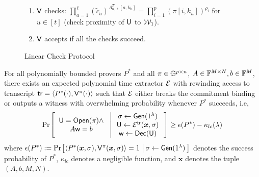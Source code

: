 \begin{figure}[h!]
{\begin{framed}
\begin{enumerate}[{\rm 1.}]
\begin{enumerate}
					\item $\innerproduct(\mathsf{pp},f_u^T\Lambda_{h,2m-1},\mathsf{cm}_{k_u},v_u;\overline{P}[\cdot,k_u])$ 
					for $u\in [t]$ where $\mathsf{cm}_{k_u}=\prod_{a=1}^{s+\ell-1}c_a^{\Lambda^T_{n,s+\ell-1}[a,k_u]}$, 
					$v_u=\sum_{i=1}^pR^i(\alpha_{j_u},\eta_{k_u})U[i,j_u,k_u]$ (check consistency of $P$ with $\pi$).
					\item $\innerproduct(\mathsf{pp},1^m||0^{m-1},\mathsf{cm},r^Tb;z)$ where $z=\beta P_0+\overline{P}\varphi$ and $\mathsf{cm}=c_0^{\beta}\cdot \prod_{a=1}^{s+\ell-1}c_k^{\varphi_k}$ (check the condition $r^TAw=r^Tb$).
					\item $\innerproduct(\mathsf{pp},f_u^T\Lambda_{h,m},C_u,\innp{\delta}{X_u})$ for $u\in [t]$ 
					where $C_u=\prod_{i=1}^p(\pi[i,k_u])^{\delta_i}$ (consistency of $X_u$ with $\pi$). 
				\end{enumerate}
				\item $\mathsf{V}$ checks: $\prod_{a=1}^\ell(\tilde{c}_a)^{\Lambda^T_{n,\ell}[a,k_u]}=\prod_{i=1}^p(\pi[i,k_u])^{\rho_i}$ for $u\in [t]$ (check proximity of $\mathsf{U}$ to $\mathcal{W}_1$).
				\item $\mathsf{V}$ accepts if all the checks succeed.
			\end{enumerate}
		\end{framed}
		\caption{Linear Check Protocol}
		\label{fig:linearcheck}
	}
\end{figure}


\begin{lemma}[Soundness]\label{lem:linercheck_sound}
For all polynomially bounded provers $P^\ast$ and all $\pi\in \mathbb{G}^{p\times n}$,
$A\in \mathbb{F}^{M\times N}, b\in \mathbb{F}^M$, there exists an expected polynomial time
extractor $\mathcal{E}$ with rewinding access to transcript $\mathsf{tr}=\langle
P^\ast(\cdot),\mathsf{V}^\pi(\cdot)\rangle$ such that $\mathcal{E}$ either breaks the 
commitment binding or outputs a witness with overwhelming probability whenever 
$P^\ast$ succeeds, i.e,
{\small
\begin{align*}
\condprob{\begin{array}{c}
\ewit=\open(\pi)\wedge \\
A\wit=b
\end{array}
}{
\begin{array}{c}
\sigma\gets \gen(\secparam) \\
\ewit\gets \extr^{\mathsf{tr}}(\bm{x},\sigma) \\
\wit\gets \dec(\ewit)
\end{array}}\geq
\epsilon(P^\ast)-\kappa_{lc}(\secpar)
\end{align*}
}
where $\epsilon(P^\ast):= \condprob{\langle P^\ast(\bm{x},\sigma),\verifier^\pi(\bm{x},\sigma)\rangle=1}{\sigma\gets \gen(\secparam)}$ denotes the success probability of $P^\ast$, $\kappa_{lc}$ denotes a negligible function, and $\bm{x}$ denotes the tuple $(A,b,M,N)$.
\end{lemma}

